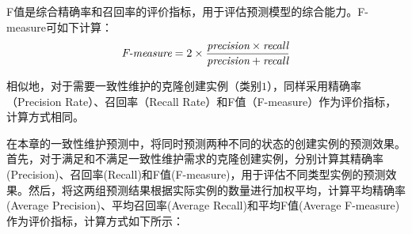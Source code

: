 F值是综合精确率和召回率的评价指标，用于评估预测模型的综合能力。F-measure可如下计算：
\begin{equation} 
\mbox{\it F-measure} =2 \times {\frac {\mbox{\it precision} \times \mbox{\it recall} }{ \mbox{\it precision} + \mbox{\it recall} } }
 \end{equation}


相似地，对于需要一致性维护的克隆创建实例（类别$1$），同样采用精确率（Precision Rate）、召回率（Recall Rate）和F值（F-measure）作为评价指标，计算方式相同。

在本章的一致性维护预测中，将同时预测两种不同的状态的创建实例的预测效果。首先，对于满足和不满足一致性维护需求的克隆创建实例，分别计算其精确率(Precision)、召回率(Recall)和F值(F-measure)，用于评估不同类型实例的预测效果。然后，将这两组预测结果根据实际实例的数量进行加权平均，计算平均精确率(Average Precision)、平均召回率(Average Recall)和平均F值(Average F-measure)作为评价指标，计算方式如下所示：

